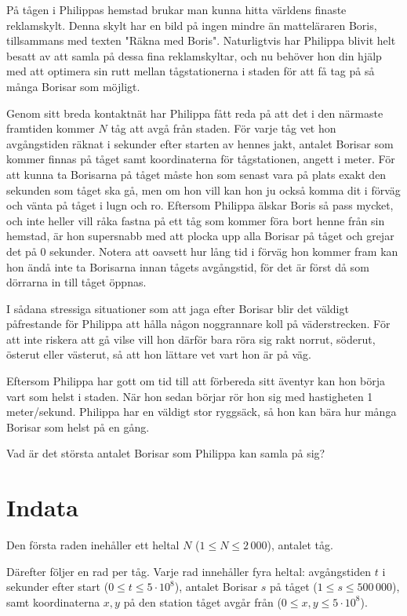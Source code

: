 På tågen i Philippas hemstad brukar man kunna hitta världens finaste reklamskylt. Denna skylt har en bild på ingen mindre än matteläraren Boris, tillsammans med texten "Räkna med Boris". 
Naturligtvis har Philippa blivit helt besatt av att samla på dessa fina reklamskyltar, och nu behöver hon din hjälp med att optimera sin rutt mellan tågstationerna i staden för att få tag på så många Borisar som möjligt.

Genom sitt breda kontaktnät har Philippa fått reda på att det i den närmaste framtiden kommer $N$ tåg att avgå från staden. För varje tåg vet hon avgångstiden räknat i sekunder efter starten av hennes jakt, antalet Borisar som kommer finnas på tåget samt koordinaterna för tågstationen, angett i meter.
För att kunna ta Borisarna på tåget måste hon som senast vara på plats exakt den sekunden som tåget ska gå, men om hon vill kan hon ju också komma dit i förväg och vänta på tåget i lugn och ro.
Eftersom Philippa älskar Boris så pass mycket, och inte heller vill råka fastna på ett tåg som kommer föra bort henne från sin hemstad, är hon supersnabb med att plocka upp alla Borisar på tåget och grejar det på 0 sekunder. 
Notera att oavsett hur lång tid i förväg hon kommer fram kan hon ändå inte ta Borisarna innan tågets avgångstid, för det är först då som dörrarna in till tåget öppnas.

I sådana stressiga situationer som att jaga efter Borisar blir det väldigt påfrestande för Philippa att hålla någon noggrannare koll på väderstrecken. För att inte riskera att gå vilse vill hon därför bara röra sig rakt norrut, söderut, österut eller västerut, så att hon lättare vet vart hon är på väg.

Eftersom Philippa har gott om tid till att förbereda sitt äventyr kan hon börja vart som helst i staden. När hon sedan börjar rör hon sig med hastigheten 1 meter/sekund. Philippa har en väldigt stor ryggsäck, så hon kan bära hur många Borisar som helst på en gång.

Vad är det största antalet Borisar som Philippa kan samla på sig?

\section*{Indata}
Den första raden inehåller ett heltal $N$ ($1 \le N \le 2\,000$), antalet tåg. 

Därefter följer en rad per tåg.
Varje rad innehåller fyra heltal: avgångstiden $t$ i sekunder efter start ($0 \le t \le 5 \cdot 10^8$), antalet Borisar $s$ på tåget ($1 \le s \le 500\,000$), samt koordinaterna $x, y$ på den station tåget avgår från ($0 \le x, y \le 5 \cdot 10^8$).

